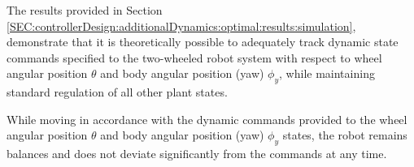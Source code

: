 \documentclass[crop=false,float=true,class=scrreprt]{standalone}
\begin{document}
The results provided in Section~
\ref{SEC:controllerDesign:additionalDynamics:optimal:results:simulation},
demonstrate that it is theoretically possible 
to adequately track dynamic state commands 
specified to the two-wheeled robot system
with respect to wheel angular position $\theta$ and body angular position (yaw) $\phi_{y}$,
while maintaining standard regulation of all other plant states.

While moving in accordance with the dynamic commands provided to the 
wheel angular position $\theta$ and body angular position (yaw) $\phi_{y}$
states, the robot remains balances and does not deviate significantly 
from the commands at any time.
\end{document}
